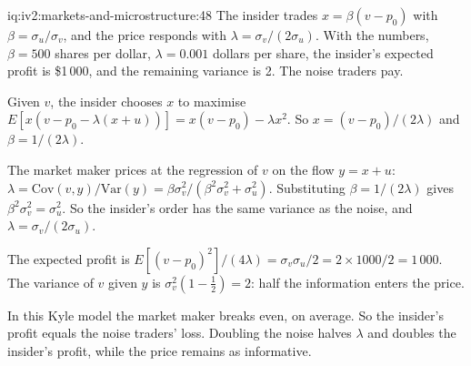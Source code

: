 \begin{solution}{iq:iv2:markets-and-microstructure:48}
The insider trades $x = \beta(v - p_0)$ with $\beta = \sigma_u/\sigma_v$, and the price responds with $\lambda = \sigma_v/(2\sigma_u)$. With the numbers, $\beta = 500$ shares per dollar, $\lambda = 0.001$ dollars per share, the insider's expected profit is \$1\,000, and the remaining variance is 2. The noise traders pay.

Given $v$, the insider chooses $x$ to maximise $E[x(v - p_0 - \lambda(x + u))] = x(v - p_0) - \lambda x^2$. So $x = (v - p_0)/(2\lambda)$ and $\beta = 1/(2\lambda)$.

The market maker prices at the regression of $v$ on the flow $y = x + u$: $\lambda = \mathrm{Cov}(v, y)/\mathrm{Var}(y) = \beta\sigma_v^2/(\beta^2\sigma_v^2 + \sigma_u^2)$. Substituting $\beta = 1/(2\lambda)$ gives $\beta^2\sigma_v^2 = \sigma_u^2$. So the insider's order has the same variance as the noise, and $\lambda = \sigma_v/(2\sigma_u)$.

The expected profit is $E[(v - p_0)^2]/(4\lambda) = \sigma_v\sigma_u/2 = 2 \times 1000/2 = 1\,000$. The variance of $v$ given $y$ is $\sigma_v^2(1 - \tfrac12) = 2$: half the information enters the price.

In this Kyle model the market maker breaks even, on average. So the insider's profit equals the noise traders' loss. Doubling the noise halves $\lambda$ and doubles the insider's profit, while the price remains as informative.

\end{solution}

